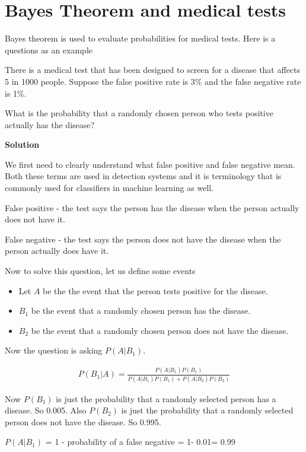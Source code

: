 \documentclass[12pt]{article}
\begin{document}
\section*{Bayes Theorem and medical tests}
Bayes theorem is used to evaluate probabilities for medical tests. Here is a questions as an example

\medskip

There is a medical test that has been designed to screen for a disease that affects 5 in 1000 people. Suppose the false positive rate is 3\% and the false negative rate is 1\%. 

What is the probability that a randomly chosen person who tests positive actually has the disease?

\textbf{Solution}

We first need to clearly understand what false positive and false negative mean. Both these terms are used in detection systems and it is terminology that is commonly used for classifiers in machine learning as well.

False positive - the test says the person has the disease when the person actually does not have it.

False negative - the test says the person does not have the disease when the person actually does have it.

Now to solve this question, let us define some events

\begin{itemize}
\item Let $A$ be the the event that the person tests positive for the disease.
\item $B_1$ be the event that a randomly chosen person has the disease.
\item $B_2$ be the event that a randomly chosen person does not have the disease.
\end{itemize}

Now the question is asking $P(A|B_1)$.

\begin{align*}
P(B_1|A) = \frac{P(A|B_1)P(B_1)}{P(A|B_1)P(B_1) + P(A|B_2)P(B_2)}
\end{align*}

Now $P(B_1)$ is  just the probability that a randomly selected person has a disease. So 0.005.
Also $P(B_2)$ is just the probability that a randomly selected person does not have the disease. So 0.995.

$P(A|B_1)$ = 1 - probability of a false negative = 1- 0.01= 0.99
\end{document}
